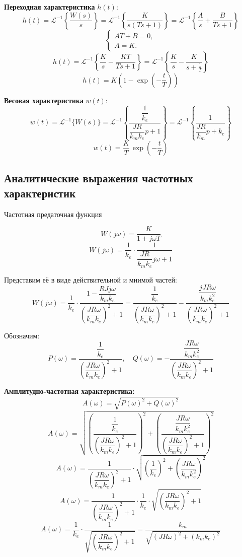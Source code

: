 \documentclass[a5paper, 10pt]{article}
\theoremstyle{definition}
\theoremstyle{plain}
\theoremstyle{remark}
\begin{document}
\textbf{Переходная характеристика} $h(t)$:
$$
h(t) = \mathcal{L}^{-1}\!\left\{ \frac{W(s)}{s} \right\}=\mathcal{L}^{-1}\!\left\{\frac{K}{s(T s + 1)}\right\}=\mathcal{L}^{-1}\!\left\{\frac{A}{s} + \frac{B}{T s + 1}\right\}
$$
\[
\begin{cases}
A T + B = 0, \\
A = K.
\end{cases}
\]
$$
h(t)=\mathcal{L}^{-1}\!\left\{\frac{K}{s} - \frac{K T}{T s + 1}\right\}
     = \mathcal{L}^{-1}\!\left\{\frac{K}{s} - \frac{K}{s + \frac{1}{T}}\right\}
$$
$$
h(t) = K \left(1 - \exp{\left(-\dfrac{t}{T}\right)}\right) 
$$

\textbf{Весовая характеристика} $w(t)$:
\[
w(t) = \mathcal{L}^{-1}\{ W(s) \}=\mathcal{L}^{-1}\left\{\frac{\dfrac{1}{k_e}}{\dfrac{J R}{k_m k_e} p + 1}\right\}=\mathcal{L}^{-1}\left\{\frac{1}{\dfrac{J R}{k_m} p + k_e}\right\}
\]
$$
w(t) = \frac{K}{T}\,\exp{\left(-\dfrac{t}{T}\right)} 
$$














\subsection{Аналитические выражения частотных характеристик}

Частотная предаточная функция 

$$
W(j\omega) = \frac{K}{1 + j \omega T}
$$
\[
W(j\omega) = \frac{1}{k_e} \cdot \frac{1}{\dfrac{JR}{k_m k_e}j\omega + 1}
\]

Представим её в виде действительной и мнимой частей:
\[
W(j\omega) = \frac{1}{k_e} \cdot \frac{1 - \dfrac{RJj\omega}{k_mk_e}}{\left( \dfrac{JR\omega}{k_m k_e} \right)^2 +   1} = \frac{\dfrac{1}{k_e}}{\left( \dfrac{JR\omega}{k_m k_e} \right)^2 +   1} - \frac{\dfrac{jJR\omega}{k_mk_e^2}}{\left( \dfrac{JR\omega}{k_m k_e} \right)^2 +   1}
\]

Обозначим:
\[
P(\omega) = \frac{\dfrac{1}{k_e}}{\left( \dfrac{JR\omega}{k_m k_e} \right)^2 +   1}, \quad Q(\omega) = - \frac{\dfrac{JR\omega}{k_mk_e^2}}{\left( \dfrac{JR\omega}{k_m k_e} \right)^2 +   1}
\]

\textbf{Амплитудно-частотная характеристика:}
$$A(\omega) = \sqrt{P(\omega)^2 + Q(\omega)^2} $$ 
$$A(\omega) = \sqrt{ \left( \frac{\dfrac{1}{k_e}}{\left( \dfrac{JR\omega}{k_m k_e} \right)^2 +   1} \right)^2 + \left( \frac{\dfrac{JR\omega}{k_mk_e^2}}{\left( \dfrac{JR\omega}{k_m k_e} \right)^2 +   1} \right)^2 } $$ 
$$A(\omega) = \frac{1}{\left( \dfrac{JR\omega}{k_m k_e} \right)^2 +   1} \cdot \sqrt{ \left( \dfrac{1}{k_e} \right)^2 + \left( \dfrac{JR\omega}{k_m k_e^2} \right)^2 } $$ 
$$A(\omega) = \frac{1}{\left( \dfrac{JR\omega}{k_m k_e} \right)^2 +   1} \cdot \frac{1}{k_e} \cdot \sqrt{ \left( \dfrac{JR\omega}{k_m k_e} \right)^2 +   1 } $$ 
$$A(\omega) = \frac{1}{k_e} \cdot \frac{1}{\sqrt{ \left( \dfrac{JR\omega}{k_m k_e} \right)^2 +   1}}=\dfrac{k_m}{\sqrt{(JR\omega)^2+(k_mk_e)^2}}$$
\end{document}
